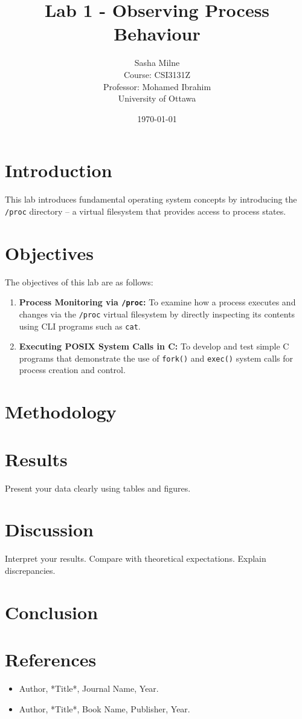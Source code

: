 \documentclass[12pt]{article}
\title{Lab 1 - Observing Process Behaviour}
\author{
    Sasha Milne \\
    Course: CSI3131Z \\
    Professor: Mohamed Ibrahim \\
    University of Ottawa
}
\date{\today}
\begin{document}
\maketitle


\section{Introduction}\label{sec:introduction}

This lab introduces fundamental operating system concepts by introducing the
\texttt{/proc} directory --
a virtual filesystem that provides access to process states.


\section{Objectives}\label{sec:objectives}

The objectives of this lab are as follows:

\begin{enumerate}
    \item \textbf{Process Monitoring via \texttt{/proc}:}
    To examine how a process executes and changes via the \texttt{/proc}
    virtual filesystem by directly inspecting its contents using CLI programs
    such as \texttt{cat}.
    \item \textbf{Executing POSIX System Calls in C:}
    To develop and test simple C programs that demonstrate the use of
    \texttt{fork()} and \texttt{exec()} system calls for process creation and control.
\end{enumerate}

\section{Methodology}\label{sec:methodology}


\section{Results}\label{sec:results}
Present your data clearly using tables and figures.


\section{Discussion}\label{sec:discussion}
Interpret your results.
Compare with theoretical expectations.
Explain discrepancies.

\section{Conclusion}\label{sec:conclusion}



\section*{References}
\begin{itemize}
    \item Author, *Title*, Journal Name, Year.
    \item Author, *Title*, Book Name, Publisher, Year.
\end{itemize}
\end{document}
